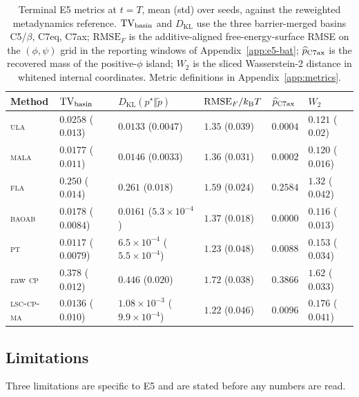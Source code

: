 \documentclass[11pt]{article}
\newcommand{\KL}{D_{\mathrm{KL}}}
\begin{document}
\begin{table}[!ht]
\centering
\footnotesize
\setlength{\tabcolsep}{4pt}
\begin{tabular}{llllll}
\toprule
Method & $\mathrm{TV}_{\rm basin}$ & $\KL(p^\star\Vert\widetilde p)$
 & $\mathrm{RMSE}_{F}/k_{\rm B}T$ & $\widehat p_{\rm C7ax}$ & $W_2$\\
\midrule
\textsc{ula}       & $0.0258$ ($0.013$) & $0.0133$ ($0.0047$) & $1.35$ ($0.039$) & $0.0004$ & $0.121$ ($0.02$)\\
\textsc{mala}      & $0.0177$ ($0.011$) & $0.0146$ ($0.0033$) & $1.36$ ($0.031$) & $0.0002$ & $0.120$ ($0.016$)\\
\textsc{fla}       & $0.250$ ($0.014$) & $0.261$ ($0.018$) & $1.59$ ($0.024$) & $0.2584$ & $1.32$ ($0.042$)\\
\textsc{baoab}     & $0.0178$ ($0.0084$) & $0.0161$ ($5.3\times10^{-4}$) & $1.37$ ($0.018$) & $0.0000$ & $0.116$ ($0.013$)\\
\textsc{pt}        & $0.0117$ ($0.0079$) & $6.5\times10^{-4}$ ($5.5\times10^{-4}$) & $1.23$ ($0.048$) & $0.0088$ & $0.153$ ($0.034$)\\
raw \textsc{cp}    & $0.378$ ($0.012$) & $0.446$ ($0.020$) & $1.72$ ($0.038$) & $0.3866$ & $1.62$ ($0.033$)\\
\textsc{lsc-cp-ma} & $0.0136$ ($0.010$) & $1.08\times10^{-3}$ ($9.9\times10^{-4}$) & $1.22$ ($0.046$) & $0.0096$ & $0.176$ ($0.041$)\\
\bottomrule
\end{tabular}
\caption{Terminal E5 metrics at $t=T$, mean (std) over seeds, against the
reweighted metadynamics reference.  $\mathrm{TV}_{\rm basin}$ and $\KL$ use the
three barrier-merged basins C5/$\beta$, C7eq, C7ax;
$\mathrm{RMSE}_F$ is the additive-aligned free-energy-surface RMSE on the
$(\phi,\psi)$ grid in the reporting windows of
Appendix~\ref{app:e5-bat}; $\widehat p_{\rm C7ax}$ is the recovered mass of the
positive-$\phi$ island; $W_2$ is the sliced Wasserstein-2 distance in whitened
internal coordinates.  Metric definitions in Appendix~\ref{app:metrics}.}
\label{tab:e5-terminal}
\end{table}

\subsection{Limitations}
\label{app:e5-limitations}

Three limitations are specific to E5 and are stated before any numbers are
read.
\end{document}
